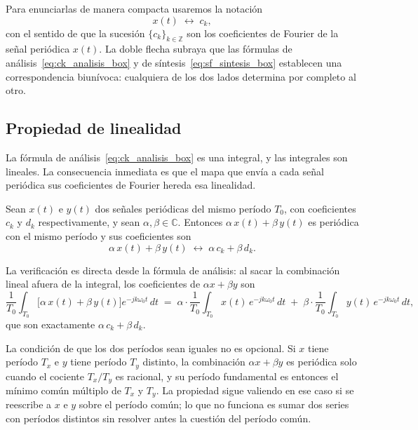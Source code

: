 \documentclass[class=book, crop=false]{standalone}
\begin{document}
Para enunciarlas de manera compacta usaremos la notación
\begin{equation*}
    x(t) \;\longleftrightarrow\; c_k,
\end{equation*}
con el sentido de que la sucesión $\{c_k\}_{k\in\mathbb{Z}}$ son los
coeficientes de Fourier de la señal periódica $x(t)$. La doble flecha
subraya que las fórmulas de análisis~\eqref{eq:ck_analisis_box} y de
síntesis~\eqref{eq:sf_sintesis_box} establecen una correspondencia
biunívoca: cualquiera de los dos lados determina por completo al
otro.

\subsection{Propiedad de linealidad}
\label{subsec:prop_linealidad}

La fórmula de análisis~\eqref{eq:ck_analisis_box} es una integral, y
las integrales son lineales. La consecuencia inmediata es que el mapa
que envía a cada señal periódica sus coeficientes de Fourier hereda
esa linealidad.

\begin{resultado}[Linealidad]
Sean $x(t)$ e $y(t)$ dos señales periódicas del mismo período $T_0$,
con coeficientes $c_k$ y $d_k$ respectivamente, y sean
$\alpha,\beta\in\mathbb{C}$. Entonces $\alpha\,x(t) + \beta\,y(t)$
es periódica con el mismo período y sus coeficientes son
\begin{equation}
    \alpha\,x(t) + \beta\,y(t)
    \;\longleftrightarrow\;
    \alpha\,c_k + \beta\,d_k.
    \label{eq:prop_linealidad}
\end{equation}
\end{resultado}

La verificación es directa desde la fórmula de análisis: al sacar la
combinación lineal afuera de la integral, los coeficientes de
$\alpha x + \beta y$ son
\begin{equation*}
    \frac{1}{T_0}\int_{T_0}\bigl[\alpha\,x(t) + \beta\,y(t)\bigr]
        e^{-jk\omega_0 t}\,dt
    \;=\; \alpha\cdot\frac{1}{T_0}\int_{T_0} x(t)\,e^{-jk\omega_0 t}\,dt
    \;+\; \beta\cdot\frac{1}{T_0}\int_{T_0} y(t)\,e^{-jk\omega_0 t}\,dt,
\end{equation*}
que son exactamente $\alpha\,c_k + \beta\,d_k$.

La condición de que los dos períodos sean iguales no es opcional. Si
$x$ tiene período $T_x$ e $y$ tiene período $T_y$ distinto, la
combinación $\alpha x + \beta y$ es periódica solo cuando el cociente
$T_x/T_y$ es racional, y su período fundamental es entonces el mínimo
común múltiplo de $T_x$ y $T_y$. La propiedad sigue valiendo en ese
caso si se reescribe a $x$ e $y$ sobre el período común; lo que no
funciona es sumar dos series con períodos distintos sin resolver
antes la cuestión del período común.
\end{document}
